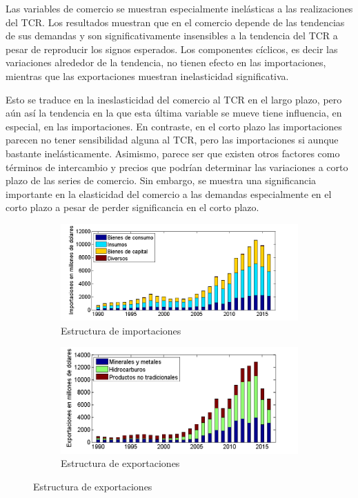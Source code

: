 \documentclass[12pt,letterpaper]{article}
\begin{document}
Las variables de comercio se muestran especialmente inelásticas a las realizaciones del TCR. Los resultados muestran que en el comercio depende de las tendencias de sus demandas y son significativamente insensibles a la tendencia del TCR a pesar de reproducir los signos esperados. Los componentes cíclicos, es decir las variaciones alrededor de la tendencia, no tienen efecto en las importaciones, mientras que las exportaciones muestran inelasticidad significativa.

Esto se traduce en la ineslasticidad del comercio al TCR en el largo plazo, pero aún así la tendencia en la que esta última variable se mueve tiene influencia, en especial, en las importaciones. En contraste, en el corto plazo las importaciones parecen no tener sensibilidad alguna al TCR, pero las importaciones si aunque bastante inelásticamente. Asimismo, parece ser que existen otros factores como términos de intercambio y precios que podrían determinar las variaciones a corto plazo de las series de comercio. Sin embargo, se muestra una significancia importante en la elasticidad del comercio a las demandas especialmente en el corto plazo a pesar de perder significancia en el corto plazo.

\begin{figure}
\captionsetup[subfigure]{aboveskip=-2pt,belowskip=-2pt}
\centering
\caption{Estructura de importaciones y exportaciones de Bolivia}\label{impexp}
    \begin{subfigure}[h]{0.65\textwidth}
        \includegraphics[width=\textwidth]{imp9016}
        \caption{Estructura de importaciones}
        \label{mestr}
    \end{subfigure}
    \begin{subfigure}[h]{0.65\textwidth}
        \includegraphics[width=\textwidth]{exp9016}
        \caption{Estructura de exportaciones}
        \label{xestr}
    \end{subfigure}
\end{figure}
\end{document}
